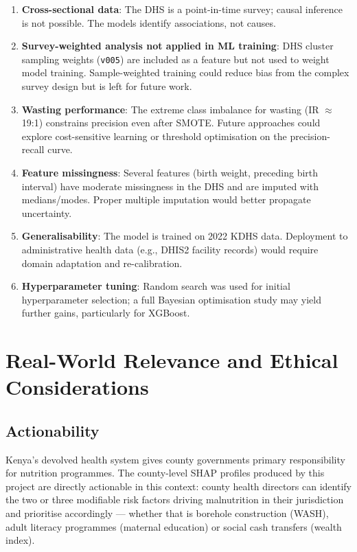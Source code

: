 \documentclass[12pt, a4paper]{article}
\begin{document}
\begin{enumerate}[leftmargin=*, itemsep=0.3em]
    \item \textbf{Cross-sectional data}: The DHS is a point-in-time
          survey; causal inference is not possible. The models identify
          associations, not causes.

    \item \textbf{Survey-weighted analysis not applied in ML training}:
          DHS cluster sampling weights (\texttt{v005}) are included as a
          feature but not used to weight model training. Sample-weighted
          training \citep{Lumley2017} could reduce bias from the
          complex survey design but is left for future work.

    \item \textbf{Wasting performance}: The extreme class imbalance for
          wasting (IR $\approx$ 19:1) constrains precision even after
          SMOTE. Future approaches could explore cost-sensitive learning
          or threshold optimisation on the precision-recall curve.

    \item \textbf{Feature missingness}: Several features (birth weight,
          preceding birth interval) have moderate missingness in the DHS
          and are imputed with medians/modes. Proper multiple imputation
          would better propagate uncertainty.

    \item \textbf{Generalisability}: The model is trained on 2022 KDHS
          data. Deployment to administrative health data (e.g., DHIS2
          facility records) would require domain adaptation and
          re-calibration.

    \item \textbf{Hyperparameter tuning}: Random search was used for
          initial hyperparameter selection; a full Bayesian optimisation
          study may yield further gains, particularly for XGBoost.
\end{enumerate}

\section{Real-World Relevance and Ethical Considerations}
\label{sec:realworld}

\subsection{Actionability}
Kenya's devolved health system gives county governments primary
responsibility for nutrition programmes. The county-level SHAP profiles
produced by this project are directly actionable in this context:
county health directors can identify the two or three modifiable risk
factors driving malnutrition in their jurisdiction and prioritise
accordingly — whether that is borehole construction (WASH), adult
literacy programmes (maternal education) or social cash transfers
(wealth index).
\end{document}
